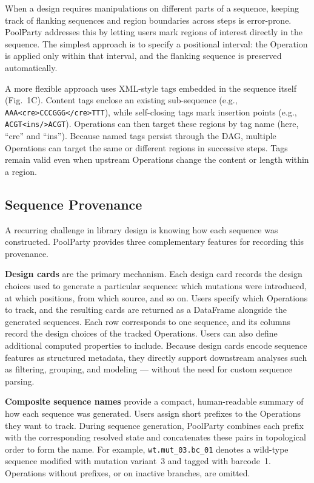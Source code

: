 \documentclass[unnumsec,webpdf,modern,large]{mam-authoring-template}%
\theoremstyle{thmstyleone}%
\theoremstyle{thmstyletwo}%
\theoremstyle{thmstylethree}%
\begin{document}
When a design requires manipulations on different parts of a sequence, keeping track of flanking sequences and region boundaries across steps is error-prone. PoolParty addresses this by letting users mark regions of interest directly in the sequence. The simplest approach is to specify a positional interval: the Operation is applied only within that interval, and the flanking sequence is preserved automatically.

A more flexible approach uses XML-style tags embedded in the sequence itself (Fig.~1C). Content tags enclose an existing sub-sequence (e.g., \texttt{AAA<cre>CCCGGG</cre>TTT}), while self-closing tags mark insertion points (e.g., \texttt{ACGT<ins/>ACGT}). Operations can then target these regions by tag name (here, ``cre'' and ``ins''). Because named tags persist through the DAG, multiple Operations can target the same or different regions in successive steps. Tags remain valid even when upstream Operations change the content or length within a region.

\subsection{Sequence Provenance}

A recurring challenge in library design is knowing how each sequence was constructed. PoolParty provides three complementary features for recording this provenance.

\textbf{Design cards} are the primary mechanism. Each design card records the design choices used to generate a particular sequence: which mutations were introduced, at which positions, from which source, and so on. Users specify which Operations to track, and the resulting cards are returned as a DataFrame alongside the generated sequences. Each row corresponds to one sequence, and its columns record the design choices of the tracked Operations. Users can also define additional computed properties to include. Because design cards encode sequence features as structured metadata, they directly support downstream analyses such as filtering, grouping, and modeling --- without the need for custom sequence parsing.

\textbf{Composite sequence names} provide a compact, human-readable summary of how each sequence was generated. Users assign short prefixes to the Operations they want to track. During sequence generation, PoolParty combines each prefix with the corresponding resolved state and concatenates these pairs in topological order to form the name. For example, \texttt{wt.mut\_03.bc\_01} denotes a wild-type sequence modified with mutation variant~3 and tagged with barcode~1. Operations without prefixes, or on inactive branches, are omitted.
\end{document}
